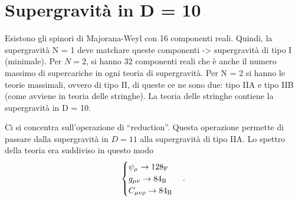 \section{Supergravità in D = 10}
Esistono gli spinori di Majorana-Weyl con 16 componenti reali. Quindi, la supergravità N = 1 deve matchare queste componenti -> supergravità di tipo I (minimale). Per $N = 2$, si hanno 32 componenti reali che è anche il numero massimo di supercariche in ogni teoria di supergravità. Per N = 2 si hanno le teorie massimali, ovvero di tipo II, di queste ce ne sono due: tipo IIA e tipo IIB (come avviene in teoria delle stringhe). La teoria delle stringhe contiene la supergravità in D = 10. 
\begin{center}
\end{center}
Ci si concentra sull'operazione di ``reduction''. Questa operazione permette di passare dalla supergravità in $D = 11$ alla supergravità di tipo IIA. Lo spettro della teoria era suddiviso in questo modo 
\begin{equation}
    \begin{cases}
        \psi_\mu \to 128_{\mathrm{F}} \\
        g_{\mu\nu} \to 84_{\mathrm{B}} \\
        C_{\mu\nu\rho} \to 84_{\mathrm{B}}
    \end{cases}.
\end{equation}
